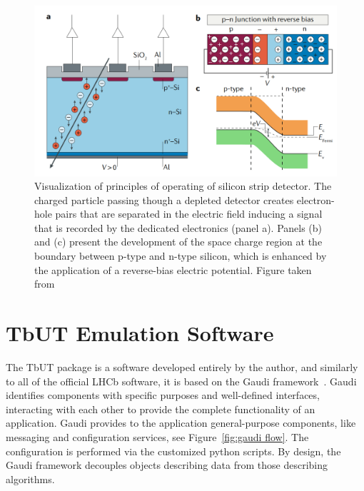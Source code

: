 \begin{figure}[h]
\centering
\includegraphics{figures/silicon_detector.png}
\caption{Visualization of principles of operating of silicon strip detector. The charged particle passing though a depleted detector creates electron-hole pairs that are separated in the electric field inducing a signal that is recorded by the dedicated electronics (panel a). Panels (b) and (c) present the development of the space charge region at the boundary between p-type and n-type silicon, which is enhanced by the application of a reverse-bias electric potential. Figure taken from~\cite{silicon_nature}}
\label{fig:silicon_det}
\end{figure}




\section{TbUT Emulation Software}
The TbUT package is a software developed entirely by the author, and similarly to all of the official LHCb software, it is based on the Gaudi framework~\cite{gaudi}. Gaudi identifies components with specific purposes and well-defined interfaces, interacting with each other to provide the complete functionality of an application. Gaudi provides to the application general-purpose components, like messaging and configuration services, see Figure~\ref{fig:gaudi flow}. The configuration is performed via the customized python scripts. By design, the Gaudi framework decouples objects describing data from those describing algorithms.



